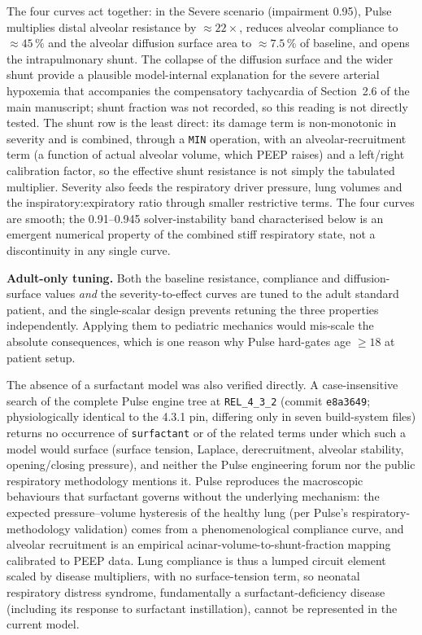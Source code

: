 \documentclass[pdflatex,sn-nature]{sn-jnl}%
\newcommand{\mainref}[2]{#2}
\begin{document}
The four curves act together: in the Severe scenario (impairment 0.95), Pulse multiplies distal alveolar resistance by $\approx 22\times$, reduces alveolar compliance to $\approx 45\,\%$ and the alveolar diffusion surface area to $\approx 7.5\,\%$ of baseline, and opens the intrapulmonary shunt. The collapse of the diffusion surface and the wider shunt provide a plausible model-internal explanation for the severe arterial hypoxemia that accompanies the compensatory tachycardia of Section~\mainref{sec:results-secondary}{2.6} of the main manuscript; shunt fraction was not recorded, so this reading is not directly tested. The shunt row is the least direct: its damage term is non-monotonic in severity and is combined, through a \texttt{MIN} operation, with an alveolar-recruitment term (a function of actual alveolar volume, which PEEP raises) and a left/right calibration factor, so the effective shunt resistance is not simply the tabulated multiplier. Severity also feeds the respiratory driver pressure, lung volumes and the inspiratory:expiratory ratio through smaller restrictive terms. The four curves are smooth; the 0.91--0.945 solver-instability band characterised below is an emergent numerical property of the combined stiff respiratory state, not a discontinuity in any single curve.

\textbf{Adult-only tuning.} Both the baseline resistance, compliance and diffusion-surface values \emph{and} the severity-to-effect curves are tuned to the adult standard patient, and the single-scalar design prevents retuning the three properties independently. Applying them to pediatric mechanics would mis-scale the absolute consequences, which is one reason why Pulse hard-gates age $\geq 18$ at patient setup.

The absence of a surfactant model was also verified directly. A case-insensitive search of the complete Pulse engine tree at \texttt{REL\_4\_3\_2} (commit \texttt{e8a3649}; physiologically identical to the 4.3.1 pin, differing only in seven build-system files) returns no occurrence of \texttt{surfactant} or of the related terms under which such a model would surface (surface tension, Laplace, derecruitment, alveolar stability, opening/closing pressure), and neither the Pulse engineering forum nor the public respiratory methodology mentions it. Pulse reproduces the macroscopic behaviours that surfactant governs without the underlying mechanism: the expected pressure--volume hysteresis of the healthy lung (per Pulse's respiratory-methodology validation) comes from a phenomenological compliance curve, and alveolar recruitment is an empirical acinar-volume-to-shunt-fraction mapping calibrated to PEEP data. Lung compliance is thus a lumped circuit element scaled by disease multipliers, with no surface-tension term, so neonatal respiratory distress syndrome, fundamentally a surfactant-deficiency disease (including its response to surfactant instillation), cannot be represented in the current model.
\end{document}
